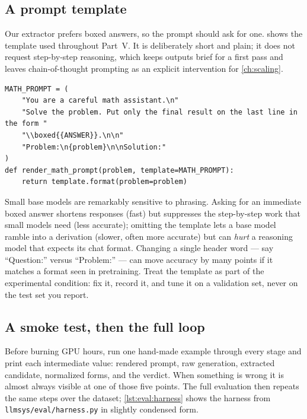 \subsection{A prompt template}
Our extractor prefers boxed answers, so the prompt should ask for one.
 shows the template used throughout Part~V. It is deliberately short and
plain; it does not request step-by-step reasoning, which keeps outputs brief for a first pass
and leaves chain-of-thought prompting as an explicit intervention for \cref{ch:scaling}.

\begin{lstlisting}[caption={The math prompt template.},label={lst:eval:prompt}]
MATH_PROMPT = (
    "You are a careful math assistant.\n"
    "Solve the problem. Put only the final result on the last line in the form "
    "\\boxed{{ANSWER}}.\n\n"
    "Problem:\n{problem}\n\nSolution:"
)
def render_math_prompt(problem, template=MATH_PROMPT):
    return template.format(problem=problem)
\end{lstlisting}

\begin{keyidea}
Small base models are remarkably sensitive to phrasing. Asking for an immediate boxed answer
shortens responses (fast) but suppresses the step-by-step work that small models need (less
accurate); omitting the template lets a base model ramble into a derivation (slower, often more
accurate) but can \emph{hurt} a reasoning model that expects its chat format. Changing a single
header word --- say ``Question:'' versus ``Problem:'' --- can move accuracy by many points if it
matches a format seen in pretraining. Treat the template as part of the experimental condition:
fix it, record it, and tune it on a validation set, never on the test set you report.
\end{keyidea}

\subsection{A smoke test, then the full loop}
Before burning GPU hours, run one hand-made example through every stage and print each
intermediate value: rendered prompt, raw generation, extracted candidate, normalized forms, and
the verdict. When something is wrong it is almost always visible at one of those five points.
The full evaluation then repeats the same steps over the dataset; \cref{lst:eval:harness} shows the
harness from \texttt{llmsys/eval/harness.py} in slightly condensed form.

